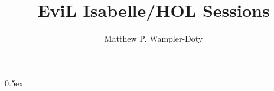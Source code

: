 \documentclass[11pt]{article}
\begin{document}
\title{EviL Isabelle/HOL Sessions}
\author{Matthew P. Wampler-Doty}
\maketitle

\tableofcontents
\newpage

\parindent 0pt\parskip 0.5ex


\end{document}
